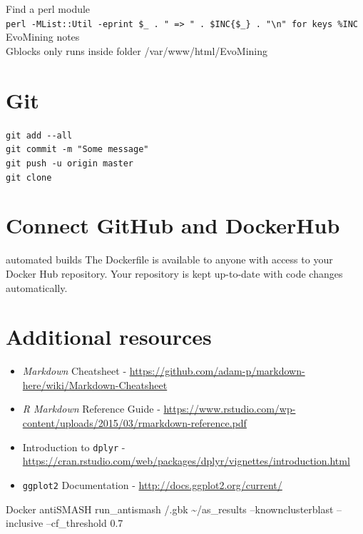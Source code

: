 \documentclass[12pt,twoside]{reedthesis}
\begin{document}
  Find a perl module\\
  \texttt{perl\ -MList::Util\ -e\textquotesingle{}print\ \$\_\ .\ "\ =\textgreater{}\ "\ .\ \$INC\{\$\_\}\ .\ "\textbackslash{}n"\ for\ keys\ \%INC\textquotesingle{}}
  EvoMining notes\\
  Gblocks only runs inside folder /var/www/html/EvoMining
  
  \section{Git}\label{git}
  
  \texttt{git\ add\ -\/-all}\\
  \texttt{git\ commit\ -m\ "Some\ message"}\\
  \texttt{git\ push\ -u\ origin\ master}\\
  \texttt{git\ clone}
  
  \section{Connect GitHub and
  DockerHub}\label{connect-github-and-dockerhub}
  
  automated builds The Dockerfile is available to anyone with access to
  your Docker Hub repository. Your repository is kept up-to-date with code
  changes automatically.
  
  \section{Additional resources}\label{additional-resources}
  
  \begin{itemize}
  \item
    \emph{Markdown} Cheatsheet -
    \url{https://github.com/adam-p/markdown-here/wiki/Markdown-Cheatsheet}
  \item
    \emph{R Markdown} Reference Guide -
    \url{https://www.rstudio.com/wp-content/uploads/2015/03/rmarkdown-reference.pdf}
  \item
    Introduction to \texttt{dplyr} -
    \url{https://cran.rstudio.com/web/packages/dplyr/vignettes/introduction.html}
  \item
    \texttt{ggplot2} Documentation -
    \url{http://docs.ggplot2.org/current/}
  \end{itemize}
  
  Docker antiSMASH run\_antismash /.gbk \textasciitilde{}/as\_results
  --knownclusterblast --inclusive --cf\_threshold 0.7
  
\end{document}
